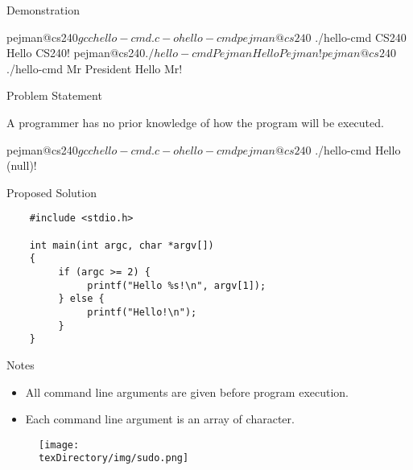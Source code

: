 \documentclass[compress]{beamer}
\begin{document}
\begin{slide}
	\begin{block}{Demonstration}

	\begin{terminal}
	pejman@cs240$ gcc hello-cmd.c -o hello-cmd
	pejman@cs240$ ./hello-cmd CS240
	Hello CS240!
	pejman@cs240$ ./hello-cmd Pejman
	Hello Pejman!
	pejman@cs240$ ./hello-cmd Mr President
	Hello Mr!
	\end{terminal}

	\end{block}
\end{slide}

\begin{slide}
	\begin{block}{Problem Statement}

	A programmer has no prior knowledge of how the program will be executed.

	\begin{terminal}
	pejman@cs240$ gcc hello-cmd.c -o hello-cmd
	pejman@cs240$ ./hello-cmd
	Hello (null)!
	\end{terminal}

	\end{block}
\end{slide}

\begin{slide}
	\begin{block}{Proposed Solution}

	\begin{verbatim}
	#include <stdio.h>

	int main(int argc, char *argv[])
	{
	     if (argc >= 2) {
	          printf("Hello %s!\n", argv[1]);
	     } else {
	          printf("Hello!\n");
	     }
	}
	\end{verbatim}

	\end{block}
\end{slide}

\begin{slide}
	\begin{block}{Notes}

	\begin{itemize}
	\item[] All command line arguments are given before program execution.
	\item[] Each command line argument is an array of character.
	\end{itemize}

	\end{block}
\end{slide}

\begin{slide}
	\begin{figure}
	\texttt{[image: \\texDirectory/img/sudo.png]}
	\end{figure}
\end{slide}
\end{document}
